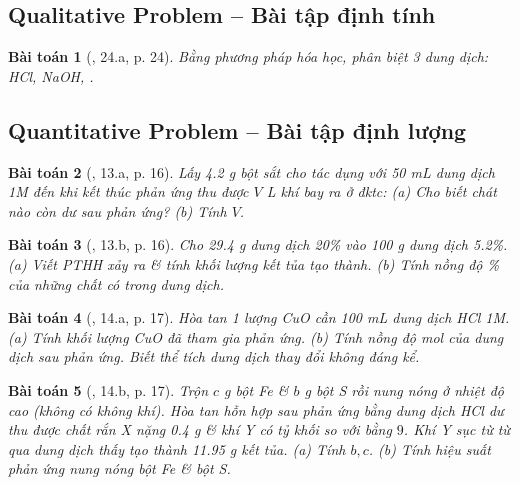 \documentclass{article}
\newtheorem{baitoan}{Bài toán}
\begin{document}
\subsection{Qualitative Problem -- Bài tập định tính}

\begin{baitoan}[\cite{An_350_BT_Hoa_Hoc_9}, 24.a, p. 24]
	Bằng phương pháp hóa học, phân biệt 3 dung dịch: \emph{HCl, NaOH, }.
\end{baitoan}

\subsection{Quantitative Problem -- Bài tập định lượng}

\begin{baitoan}[\cite{An_350_BT_Hoa_Hoc_9}, 13.a, p. 16]
	Lấy \emph{4.2 g} bột sắt cho tác dụng với \emph{50 mL} dung dịch \emph{ 1M} đến khi kết thúc phản ứng thu được $V$ \emph{L} khí \emph{} bay ra ở đktc: (a) Cho biết chát nào còn dư sau phản ứng? (b) Tính $V$.
\end{baitoan}

\begin{baitoan}[\cite{An_350_BT_Hoa_Hoc_9}, 13.b, p. 16]
	Cho \emph{29.4 g} dung dịch \emph{ 20\%} vào \emph{100 g} dung dịch \emph{ 5.2\%}. (a) Viết PTHH xảy ra \& tính khối lượng kết tủa tạo thành. (b) Tính nồng độ \% của những chất có trong dung dịch.
\end{baitoan}

\begin{baitoan}[\cite{An_350_BT_Hoa_Hoc_9}, 14.a, p. 17]
	Hòa tan 1 lượng \emph{CuO} cần \emph{100 mL} dung dịch \emph{HCl 1M}. (a) Tính khối lượng \emph{CuO} đã tham gia phản ứng. (b) Tính nồng độ mol của dung dịch sau phản ứng. Biết thể tích dung dịch thay đổi không đáng kể.
\end{baitoan}

\begin{baitoan}[\cite{An_350_BT_Hoa_Hoc_9}, 14.b, p. 17]
	Trộn $c$ \emph{g} bột \emph{Fe} \& $b$ \emph{g} bột \emph{S} rồi nung nóng ở nhiệt độ cao (không có không khí). Hòa tan hỗn hợp sau phản ứng bằng dung dịch \emph{HCl} dư thu được chất rắn X nặng \emph{0.4 g} \& khí Y có tỷ khối so với \emph{} bằng $9$. Khí Y sục từ từ qua dung dịch \emph{} thấy tạo thành \emph{11.95 g} kết tủa. (a) Tính $b,c$. (b) Tính hiệu suất phản ứng nung nóng bột \emph{Fe} \& bột \emph{S}.
\end{baitoan}
\end{document}
